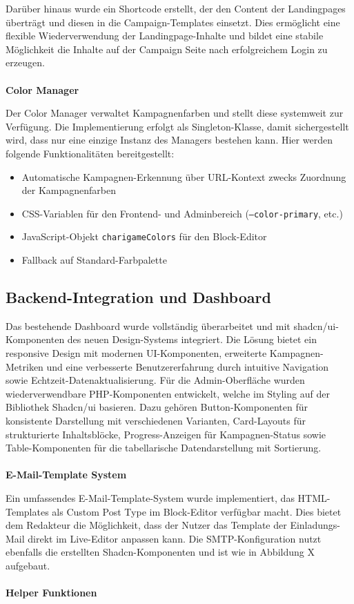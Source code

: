 Darüber hinaus wurde ein Shortcode erstellt, der den Content der Landingpages überträgt und diesen in die Campaign-Templates einsetzt.
Dies ermöglicht eine flexible Wiederverwendung der Landingpage-Inhalte und bildet eine stabile Möglichkeit die Inhalte auf der Campaign Seite nach erfolgreichem Login zu erzeugen.
\\\\
\textbf{Color Manager}

Der Color Manager verwaltet Kampagnenfarben und stellt diese systemweit zur Verfügung.
Die Implementierung erfolgt als Singleton-Klasse, damit sichergestellt wird, dass nur eine einzige Instanz des Managers bestehen kann.
Hier werden folgende Funktionalitäten bereitgestellt:

\begin{itemize}
    \item Automatische Kampagnen-Erkennung über URL-Kontext zwecks Zuordnung der Kampagnenfarben
    \item CSS-Variablen für den Frontend- und Adminbereich (\texttt{--color-primary}, etc.)
    \item JavaScript-Objekt \texttt{charigameColors} für den Block-Editor
    \item Fallback auf Standard-Farbpalette
\end{itemize}

\subsection{Backend-Integration und Dashboard}

Das bestehende Dashboard wurde vollständig überarbeitet und mit shadcn/ui-Komponenten des neuen Design-Systems integriert.
Die Lösung bietet ein responsive Design mit modernen UI-Komponenten, erweiterte Kampagnen-Metriken und eine verbesserte Benutzererfahrung durch intuitive Navigation sowie Echtzeit-Datenaktualisierung.
Für die Admin-Oberfläche wurden wiederverwendbare PHP-Komponenten entwickelt, welche im Styling auf der Bibliothek Shadcn/ui basieren.
Dazu gehören Button-Komponenten für konsistente Darstellung mit verschiedenen Varianten, Card-Layouts für strukturierte Inhaltsblöcke, Progress-Anzeigen für Kampagnen-Status sowie Table-Komponenten für die tabellarische Datendarstellung mit Sortierung.
\\\\
\textbf{E-Mail-Template System}

Ein umfassendes E-Mail-Template-System wurde implementiert, das HTML-Templates als Custom Post Type im Block-Editor verfügbar macht.
Dies bietet dem Redakteur die Möglichkeit, dass der Nutzer das Template der Einladungs-Mail direkt im Live-Editor anpassen kann.
Die SMTP-Konfiguration nutzt ebenfalls die erstellten Shadcn-Komponenten und ist wie in Abbildung X aufgebaut. %
\\\\
\textbf{Helper Funktionen}

